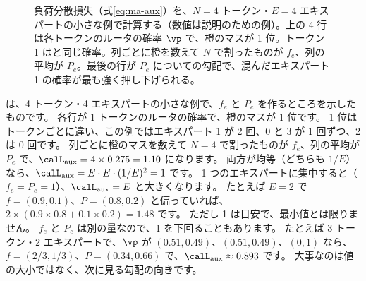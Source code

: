 \begin{figure}[tbp]
\centering
{}
\caption{負荷分散損失（式\eqref{eq:ma-aux}）を、$N=4$ トークン・$E=4$ エキスパートの小さな例で計算する（数値は説明のための例）。上の 4 行は各トークンのルータの確率 $\vp$ で、橙のマスが 1 位。トークン 1 はと同じ確率。列ごとに橙を数えて $N$ で割ったものが $f_e$、列の平均が $P_e$。最後の行が $P_e$ についての勾配で、混んだエキスパート 1 の確率が最も強く押し下げられる。}
\label{fig:ma-aux}
\end{figure}

は、4 トークン・4 エキスパートの小さな例で、$f_e$ と $P_e$ を作るところを示したものです。
各行が 1 トークンのルータの確率で、橙のマスが 1 位です。
1 位はトークンごとに違い、この例ではエキスパート 1 が 2 回、0 と 3 が 1 回ずつ、2 は 0 回です。
列ごとに橙のマスを数えて $N=4$ で割ったものが $f_e$、列の平均が $P_e$ で、$\calL_{\mathrm{aux}}=4\times0.275=1.10$ になります。
両方が均等（どちらも $1/E$）なら、$\calL_{\mathrm{aux}}=E\cdot E\cdot(1/E)^2=1$ です。
1 つのエキスパートに集中すると（$f_e=P_e=1$）、$\calL_{\mathrm{aux}}=E$ と大きくなります。
たとえば $E=2$ で $f=(0.9,0.1)$、$P=(0.8,0.2)$ と偏っていれば、$2\times(0.9\times0.8+0.1\times0.2)=1.48$ です。
ただし 1 は目安で、最小値とは限りません。
$f_e$ と $P_e$ は別の量なので、1 を下回ることもあります。
たとえば 3 トークン・2 エキスパートで、$\vp$ が $(0.51,0.49)$、$(0.51,0.49)$、$(0,1)$ なら、$f=(2/3,1/3)$、$P=(0.34,0.66)$ で、$\calL_{\mathrm{aux}}\approx0.893$ です。
大事なのは値の大小ではなく、次に見る勾配の向きです。

